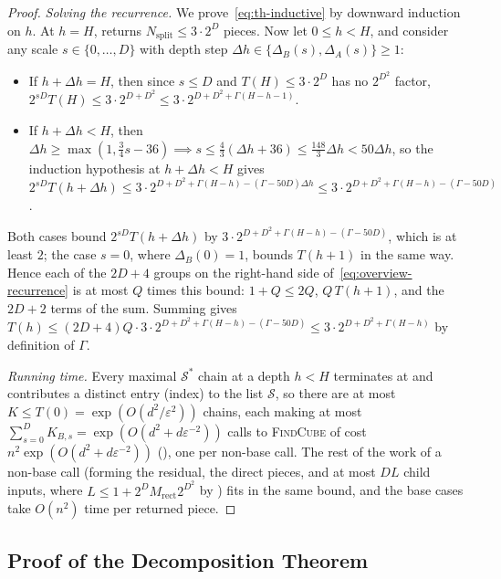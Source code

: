 \documentclass[11pt]{article}
\theoremstyle{definition}
\renewcommand{\label}[1]{}%
\newcommand{\FindCube}{\textnormal{\textsc{FindCube}}}
\begin{document}
\begin{proof}
\emph{Solving the recurrence.} We prove~\eqref{eq:th-inductive} by downward induction on $h$. At $h = H$,  returns $N_{\text{split}} \le 3 \cdot 2^D$ pieces. Now let $0 \le h < H$, and consider any scale $s \in \{0, \dots, D\}$ with depth step $\Delta h \in \{\Delta_B(s), \Delta_A(s)\} \ge 1$:
\begin{itemize}[leftmargin=*]
    \item If $h + \Delta h = H$, then since $s \le D$ and $T(H) \le 3 \cdot 2^D$ has no $2^{D^2}$ factor, $2^{s D} T(H) \le 3 \cdot 2^{D + D^2} \le 3 \cdot 2^{D + D^2 + \Gamma(H - h - 1)}$.
    \item If $h + \Delta h < H$, then $\Delta h \ge \max(1, \frac{3}{4}s - 36) \implies s \le \frac{4}{3}(\Delta h + 36) \le \frac{148}{3}\Delta h < 50\Delta h$, so the induction hypothesis at $h + \Delta h < H$ gives $2^{s D} T(h + \Delta h) \le 3 \cdot 2^{D + D^2 + \Gamma(H - h) - (\Gamma - 50D)\Delta h} \le 3 \cdot 2^{D + D^2 + \Gamma(H - h) - (\Gamma - 50D)}$.
\end{itemize}
Both cases bound $2^{s D} T(h + \Delta h)$ by $3 \cdot 2^{D + D^2 + \Gamma(H - h) - (\Gamma - 50D)}$, which is at least $2$; the case $s = 0$, where $\Delta_B(0) = 1$, bounds $T(h + 1)$ in the same way. Hence each of the $2D + 4$ groups on the right-hand side of~\eqref{eq:overview-recurrence} is at most $Q$ times this bound: $1 + Q \le 2Q$, $Q\,T(h + 1)$, and the $2D + 2$ terms of the sum. Summing gives $T(h) \le (2D+4)Q \cdot 3 \cdot 2^{D + D^2 + \Gamma(H - h) - (\Gamma - 50D)} \le 3 \cdot 2^{D + D^2 + \Gamma(H - h)}$ by definition of $\Gamma$.

\emph{Running time.} Every maximal $\mathcal{S}^*$ chain at a depth $h < H$ terminates at  and contributes a distinct entry (index) to the list $\mathcal{S}$, so there are at most $K \le T(0) = \exp(O(d^2 / \varepsilon^2))$ chains, each making at most $\sum_{s=0}^D K_{B, s} = \exp(O(d^2 + d\varepsilon^{-2}))$ calls to \FindCube{} of cost $n^2 \exp(O(d^2 + d\varepsilon^{-2}))$ (), one per non-base call. The rest of the work of a non-base call (forming the residual, the direct pieces, and at most $DL$ child inputs, where $L \le 1 + 2^D M_{\text{rect}} 2^{D^2}$ by ) fits in the same bound, and the base cases take $O(n^2)$ time per returned piece.
\end{proof}

\subsection{Proof of the Decomposition Theorem}
\label{sec:3d-proof}
\end{document}
